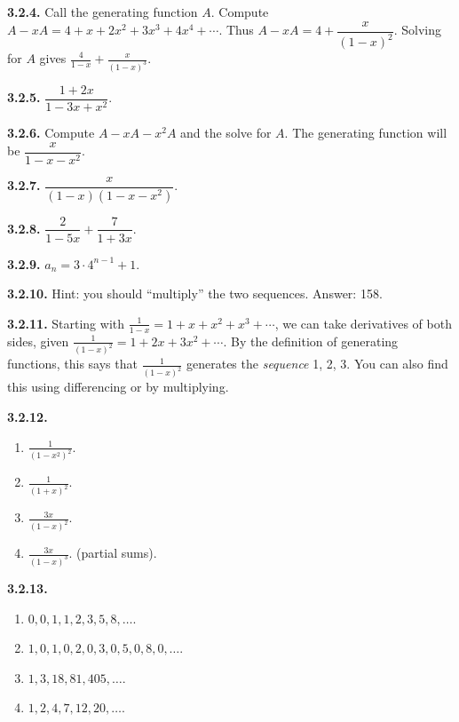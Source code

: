 \documentclass[10pt,]{book}
\theoremstyle{plain}
\theoremstyle{definition}
\theoremstyle{definition}
\theoremstyle{definition}
\theoremstyle{definition}
\numberwithin{equation}{chapter}
\def\d{\displaystyle}
\begin{document}
%
\par\smallskip
\noindent\textbf{3.2.4.} \hypertarget{p-1133}{}%
Call the generating function \(A\). Compute \(A - xA = 4 + x + 2x^2 + 3x^3 + 4x^4 + \cdots\). Thus \(A - xA = 4 + \dfrac{x}{(1-x)^2}\). Solving for \(A\) gives \(\d\frac{4}{1-x} + \frac{x}{(1-x)^3}\).%
\par\smallskip
\noindent\textbf{3.2.5.} \hypertarget{p-1135}{}%
\(\dfrac{1+2x}{1-3x + x^2}\).%
\par\smallskip
\noindent\textbf{3.2.6.} \hypertarget{p-1137}{}%
Compute \(A - xA - x^2A\) and the solve for \(A\). The generating function will be \(\dfrac{x}{1-x-x^2}\).%
\par\smallskip
\noindent\textbf{3.2.7.} \hypertarget{p-1139}{}%
\(\dfrac{x}{(1-x)(1-x-x^2)}\).%
\par\smallskip
\noindent\textbf{3.2.8.} \hypertarget{p-1141}{}%
\(\dfrac{2}{1-5x} + \dfrac{7}{1+3x}\).%
\par\smallskip
\noindent\textbf{3.2.9.} \hypertarget{p-1143}{}%
\(a_n = 3\cdot 4^{n-1} + 1\).%
\par\smallskip
\noindent\textbf{3.2.10.} \hypertarget{p-1145}{}%
Hint: you should ``multiply'' the two sequences. Answer: 158.%
\par\smallskip
\noindent\textbf{3.2.11.} \hypertarget{p-1147}{}%
Starting with \(\frac{1}{1-x} = 1 + x + x^2 + x^3 +\cdots\), we can take derivatives of both sides, given \(\frac{1}{(1-x)^2} = 1 + 2x + 3x^2 + \cdots\). By the definition of generating functions, this says that \(\frac{1}{(1-x)^2}\) generates the \emph{sequence} 1, 2, 3\textellipsis{}. You can also find this using differencing or by multiplying.%
\par\smallskip
\noindent\textbf{3.2.12.} \hypertarget{p-1150}{}%
\leavevmode%
\begin{enumerate}[label=(\alph*)]
\item\hypertarget{li-194}{}\(\frac{1}{(1-x^2)^2}\).%
\item\hypertarget{li-195}{}\(\frac{1}{(1+x)^2}\).%
\item\hypertarget{li-196}{}\(\frac{3x}{(1-x)^2}\).%
\item\hypertarget{li-197}{}\(\frac{3x}{(1-x)^3}\).  (partial sums).%
\end{enumerate}
%
\par\smallskip
\noindent\textbf{3.2.13.} \hypertarget{p-1153}{}%
\leavevmode%
\begin{enumerate}[label=(\alph*)]
\item\hypertarget{li-202}{}\(0,0,1,1,2,3,5,8, \ldots\).%
\item\hypertarget{li-203}{}\(1, 0, 1, 0, 2, 0, 3, 0, 5, 0, 8, 0, \ldots\).%
\item\hypertarget{li-204}{}\(1, 3, 18, 81, 405, \ldots\).%
\item\hypertarget{li-205}{}\(1, 2, 4, 7, 12, 20, \ldots\).%
\end{enumerate}
\end{document}
